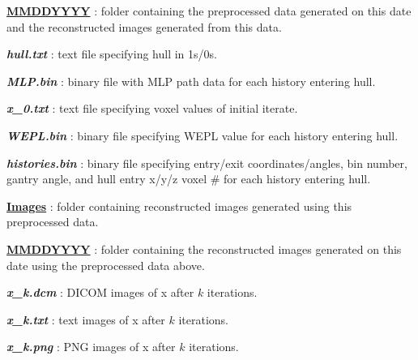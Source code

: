 \documentclass{article}
\begin{document}
\begin{myEnumerate}[labelindent=0pt, leftmargin=*]
\begin{myEnumerate}[labelindent=1pt, leftmargin=*]
\begin{myEnumerate}[labelindent=1pt, leftmargin=*]
\begin{myEnumerate}[labelindent=1pt, leftmargin=*]
\begin{myEnumerate}[labelindent=1pt, leftmargin=*]
\begin{myEnumerate}[labelindent=1pt, leftmargin=*]
\begin{myEnumerate}[labelindent=1pt, leftmargin=*]
                            \begin{myEnumerate}[labelindent=1pt, leftmargin=*]
                                \item \ul{\textbf{MMDDYYYY}} : folder containing the preprocessed data generated on this date and the reconstructed images generated from this data.
                                \begin{myEnumerate}[labelindent=1pt, leftmargin=*]
                                    \item \textbf{\textit{hull.txt}} : text file specifying hull in 1s/0s.
                                    \item \textbf{\textit{MLP.bin}} : binary file with MLP path data for each history entering hull.
                                    \item \textbf{\textit{x\_0.txt}} : text file specifying voxel values of initial iterate.
                                    \item \textbf{\textit{WEPL.bin}} : binary file specifying WEPL value for each history entering hull.
                                    \item \textbf{\textit{histories.bin}} : binary file specifying entry/exit coordinates/angles, bin number, gantry angle, and hull entry x/y/z voxel \# for each history entering hull.
                                    \item \ul{\textbf{Images}} : folder containing reconstructed images generated using this preprocessed data.
                                    \begin{myEnumerate}[labelindent=1pt, leftmargin=*]
                                        \item \ul{\textbf{MMDDYYYY}} : folder containing the reconstructed images generated on this date using the preprocessed data above.
                                            \begin{myEnumerate}[labelindent=1pt, leftmargin=*]
                                                \item \textbf{\textit{x\_k.dcm}} : DICOM images of x after $k$ iterations.
                                                \item \textbf{\textit{x\_k.txt}} : text images of x after $k$ iterations.
                                                \item \textbf{\textit{x\_k.png}} : PNG images of x after $k$ iterations.
                                            \end{myEnumerate}

\end{myEnumerate}
\end{myEnumerate}
\end{myEnumerate}
\end{myEnumerate}
\end{myEnumerate}
\end{myEnumerate}
\end{myEnumerate}
\end{myEnumerate}
\end{myEnumerate}
\end{myEnumerate}
\end{document}
